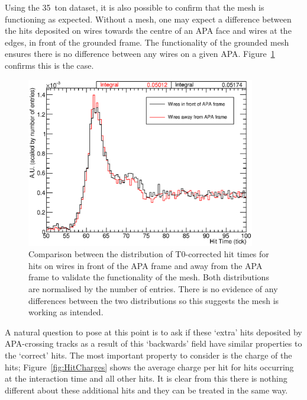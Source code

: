 Using the 35~ton dataset, it is also possible to confirm that the mesh is functioning as expected.  Without a mesh, one may expect a difference between the hits deposited on wires towards the centre of an APA face and wires at the edges, in front of the grounded frame.  The functionality of the grounded mesh ensures there is no difference between any wires on a given APA.  Figure~\ref{fig:HitTimesFrame} confirms this is the case.

\begin{figure}
  \centering
  \includegraphics[width=10cm]{HitTimesFrame.eps}
  \caption[Comparison between the distribution of T0-corrected hit times for hits on wires in front of the APA frame and away from the APA frame to validate the functionality of the mesh.]{Comparison between the distribution of T0-corrected hit times for hits on wires in front of the APA frame and away from the APA frame to validate the functionality of the mesh.  Both distributions are normalised by the number of entries.  There is no evidence of any differences between the two distributions so this suggests the mesh is working as intended.}
  \label{fig:HitTimesFrame}
\end{figure}

A natural question to pose at this point is to ask if these `extra' hits deposited by APA-crossing tracks as a result of this `backwards' field have similar properties to the `correct' hits.  The most important property to consider is the charge of the hits; Figure~\ref{fig:HitCharges} shows the average charge per hit for hits occurring at the interaction time and all other hits.  It is clear from this there is nothing different about these additional hits and they can be treated in the same way.

